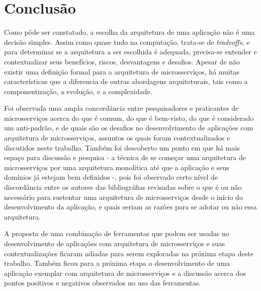\chapter{Conclusão}\label{chapter-conclusao}

Como pôde ser constatado, a escolha da arquitetura de uma aplicação não é uma decisão simples. Assim como quase tudo na computação, trata-se de \emph{tradeoffs}, e para determinar se a arquitetura a ser escolhida é adequada, precisa-se entender e contextualizar seus benefícios, riscos, desvantagens e desafios. Apesar de não existir uma definição formal para a arquitetura de microsserviços, há muitas características que a diferencia de outras abordagens arquiteturais, tais como a componentização, a evolução, e a complexidade.

Foi observada uma ampla concordância entre pesquisadores e praticantes de microsserviços acerca do que é comum, do que é bem-visto, do que é considerado um anti-padrão, e de quais são os desafios no desenvolvimento de aplicações com arquitetura de microsserviços, assuntos os quais foram contextualizados e discutidos neste trabalho. Também foi descoberto um ponto em que há mais espaço para discussão e pesquisa - a técnica de se começar uma arquitetura de microsserviços por uma arquitetura monolítica até que a aplicação e seus domínios já estejam bem definidos -, pois foi observado certo nível de discordância entre os autores das bibliográfias revisadas sobre o que é ou não necessário para sustentar uma arquitetura de microsserviços desde o início do desenvolvimento da aplicação, e quais seriam as razões para se adotar ou não essa arquitetura.

A proposta de uma combinação de ferramentas que podem ser usadas no desenvolvimento de aplicações com arquitetura de microsserviços e suas contextualizações ficaram adiadas para serem exploradas na próxima etapa deste trabalho. Também ficou para a próxima etapa o desenvolvimento de uma aplicação exemplar com arquitetura de microsserviços e a discussão acerca dos pontos positivos e negativos observados no uso das ferramentas.



